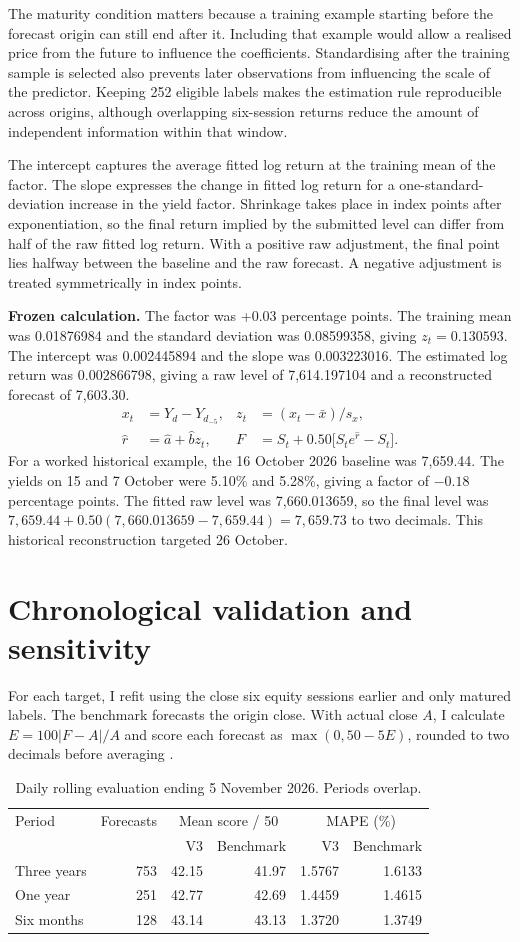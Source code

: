 \documentclass[11pt,a4paper]{article}
\newcommand{\freezecalc}{The factor was +0.03 percentage points. The training mean was 0.01876984 and the standard deviation was 0.08599358, giving $z_t=0.130593$. The intercept was 0.002445894 and the slope was 0.003223016. The estimated log return was 0.002866798, giving a raw level of 7,614.197104 and a reconstructed forecast of 7,603.30}
\begin{document}
The maturity condition matters because a training example starting before the forecast origin can still end after it. Including that example would allow a realised price from the future to influence the coefficients. Standardising after the training sample is selected also prevents later observations from influencing the scale of the predictor. Keeping 252 eligible labels makes the estimation rule reproducible across origins, although overlapping six-session returns reduce the amount of independent information within that window.

The intercept captures the average fitted log return at the training mean of the factor. The slope expresses the change in fitted log return for a one-standard-deviation increase in the yield factor. Shrinkage takes place in index points after exponentiation, so the final return implied by the submitted level can differ from half of the raw fitted log return. With a positive raw adjustment, the final point lies halfway between the baseline and the raw forecast. A negative adjustment is treated symmetrically in index points.

\textbf{Frozen calculation.} \freezecalc.
\begin{align*}
x_t &= Y_d-Y_{d_{-5}}, &
z_t &= (x_t-\bar{x})/s_x,\\
\hat r &= \hat a+\hat b z_t, &
F &= S_t+0.50\bigl[S_t e^{\hat r}-S_t\bigr].
\end{align*}
For a worked historical example, the 16 October 2026 baseline was 7,659.44. The yields on 15 and 7 October were 5.10\% and 5.28\%, giving a factor of $-0.18$ percentage points. The fitted raw level was 7,660.013659, so the final level was $7{,}659.44+0.50(7{,}660.013659-7{,}659.44)=7{,}659.73$ to two decimals. This historical reconstruction targeted 26 October.

\section{Chronological validation and sensitivity}
For each target, I refit using the close six equity sessions earlier and only matured labels. The benchmark forecasts the origin close. With actual close $A$, I calculate $E=100|F-A|/A$ and score each forecast as $\max(0,50-5E)$, rounded to two decimals before averaging \cite{brief}.

\begin{table}[htbp]
\centering
\caption{Daily rolling evaluation ending 5 November 2026. Periods overlap.}
\begin{tabular}{@{}lrrrrr@{}}
\toprule
Period & Forecasts & \multicolumn{2}{c}{Mean score / 50} & \multicolumn{2}{c}{MAPE (\%)}\\
& & V3 & Benchmark & V3 & Benchmark\\
\midrule
Three years & 753 & 42.15 & 41.97 & 1.5767 & 1.6133\\
One year & 251 & 42.77 & 42.69 & 1.4459 & 1.4615\\
Six months & 128 & 43.14 & 43.13 & 1.3720 & 1.3749\\
\bottomrule
\end{tabular}
\end{table}
\end{document}
